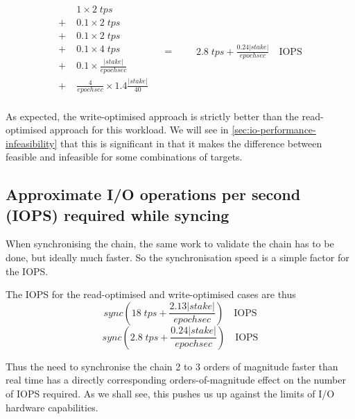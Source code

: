 \documentclass[11pt,a4paper]{article}
\begin{document}
\begin{equation}
\begin{aligned}
       &   1 \times 2 \; \mathit{tps} \\
  + \; & 0.1 \times 2 \; \mathit{tps} \\
  + \; & 0.1 \times 2 \; \mathit{tps} \\
  + \; & 0.1 \times 4 \; \mathit{tps} \\
  + \; & 0.1 \times   \frac{|\mathit{stake}|}{\mathit{epochsec}} \\
  + \; & \frac{4}{\mathit{epochsec}} \times 1.4 \frac{|\mathit{stake}|}{40} \\
\end{aligned}
\quad = \quad
\begin{aligned}
      & 2.8 \; \mathit{tps} + \frac{0.24 |stake|}{\mathit{epochsec}} \quad\text{IOPS}
\end{aligned}
\end{equation}

As expected, the write-optimised approach is strictly better than the
read-optimised approach for this workload. We will see in
\cref{sec:io-performance-infeasibility} that this is significant in that it
makes the difference between feasible and infeasible for some combinations of
targets.

\subsection{Approximate I/O operations per second (IOPS) required while syncing}
\label{sec:approximate-io-operations-per-second-required-while-syncing}

When synchronising the chain, the same work to validate the chain has to be
done, but ideally much faster. So the synchronisation speed is a simple factor
for the IOPS.

The IOPS for the read-optimised and write-optimised cases are thus
\begin{equation}\label{eq:iops-read-optimised}
\mathit{sync} \left(18 \; \mathit{tps}
                  + \frac{2.13 |stake|}{\mathit{epochsec}}
              \right) \quad\text{IOPS}
\end{equation}
\begin{equation}\label{eq:iops-write-optimised}
\mathit{sync} \left(2.8 \; \mathit{tps}
                  + \frac{0.24 |stake|}{\mathit{epochsec}}
              \right) \quad\text{IOPS}
\end{equation}

Thus the need to synchronise the chain 2 to 3 orders of magnitude faster than
real time has a directly corresponding orders-of-magnitude effect on the number
of IOPS required. As we shall see, this pushes us up against the limits of
I/O hardware capabilities.
\end{document}
